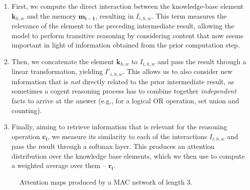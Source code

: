 \documentclass[fleqn]{article}
\begin{document}
\begin{enumerate}  
\item First, we compute the direct interaction between the knowledge-base element \({\boldsymbol{k}_{h,w}}\) and the memory \(\boldsymbol{m_{i-1}}\), resulting in \(I_{i,h,w}\). This term measures the relevance of the element to the preceding intermediate result, allowing the model to perform transitive reasoning by considering content that now seems important in light of information obtained from the prior computation step. 

\item Then, we concatenate the element \({\boldsymbol{k}_{h,w}}\) to \(I_{i,h,w}\) and pass the result through a linear transformation, yielding \(I'_{i,h,w}\). This allows us to also consider new information that is \textit{not} directly related to the prior intermediate result, as sometimes a cogent reasoning process has to combine together \textit{independent} facts to arrive at the answer (e.g., for a logical OR operation, set union and counting). 

\item Finally, aiming to retrieve information that is relevant for the reasoning operation \(\boldsymbol{c_i}\), we measure its similarity to each of the interactions \(I_{i,h,w}\) and pass the result through a softmax layer. This produces an attention distribution over the knowledge base elements, which we then use to compute a weighted average over them -- \(\boldsymbol{r_i}\).

\end{enumerate}  

\begin{wrapfigure}[15]{r}{0.32\textwidth}
\vspace*{-8mm}
\begin{minipage}{0.4\linewidth}
\centering
\vspace*{3mm}
\end{minipage}
\begin{minipage}{0.58\linewidth}
\noindent
\centering
{}

\vspace*{-3.5mm}

\vspace*{-3.5mm}
\end{minipage}

\scriptsize 

\vspace*{-1mm}
\caption{Attention maps produced by a MAC network of length 3.}
\label{fig:rexample}
\end{wrapfigure}
\end{document}
